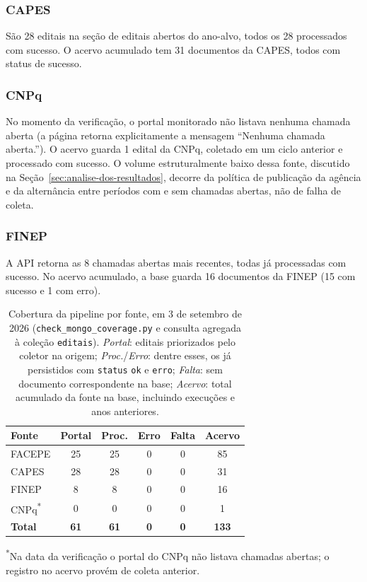 \documentclass[12pt]{article}
\begin{document}
  \subsubsection{CAPES}
  São 28 editais na seção de editais abertos do ano-alvo, todos os 28 processados com sucesso. O acervo acumulado tem 31 documentos da CAPES, todos com status de sucesso.

  \subsubsection{CNPq}
  No momento da verificação, o portal monitorado não listava nenhuma chamada aberta (a página retorna explicitamente a mensagem ``Nenhuma chamada aberta.''). O acervo guarda 1 edital da CNPq, coletado em um ciclo anterior e processado com sucesso. O volume estruturalmente baixo dessa fonte, discutido na Seção~\ref{sec:analise-dos-resultados}, decorre da política de publicação da agência e da alternância entre períodos com e sem chamadas abertas, não de falha de coleta.

  \subsubsection{FINEP}
  A API retorna as 8 chamadas abertas mais recentes, todas já processadas com sucesso. No acervo acumulado, a base guarda 16 documentos da FINEP (15 com sucesso e 1 com erro).

  \begin{table}[t]
  \caption{Cobertura da pipeline por fonte, em 3 de setembro de 2026 (\texttt{check\_mongo\_coverage.py} e consulta agregada à coleção \texttt{editais}). \emph{Portal}: editais priorizados pelo coletor na origem; \emph{Proc.}/\emph{Erro}: dentre esses, os já persistidos com \texttt{status} \texttt{ok} e \texttt{erro}; \emph{Falta}: sem documento correspondente na base; \emph{Acervo}: total acumulado da fonte na base, incluindo execuções e anos anteriores.}
  \label{tab:cobertura}
  \centering
  \begin{tabular}{lccccc}
  \hline
  \textbf{Fonte} & \textbf{Portal} & \textbf{Proc.} & \textbf{Erro} & \textbf{Falta} & \textbf{Acervo} \\
  \hline
  FACEPE & 25 & 25 & 0 & 0 & 85 \\
  CAPES  & 28 & 28 & 0 & 0 & 31 \\
  FINEP  & 8  & 8  & 0 & 0 & 16 \\
  CNPq\textsuperscript{*} & 0 & 0 & 0 & 0 & 1 \\
  \hline
  \textbf{Total} & \textbf{61} & \textbf{61} & \textbf{0} & \textbf{0} & \textbf{133} \\
  \hline
  \end{tabular}

  \vspace{2pt}
  {\footnotesize \textsuperscript{*}Na data da verificação o portal do CNPq não listava chamadas abertas; o registro no acervo provém de coleta anterior.}
  \end{table}
\end{document}

